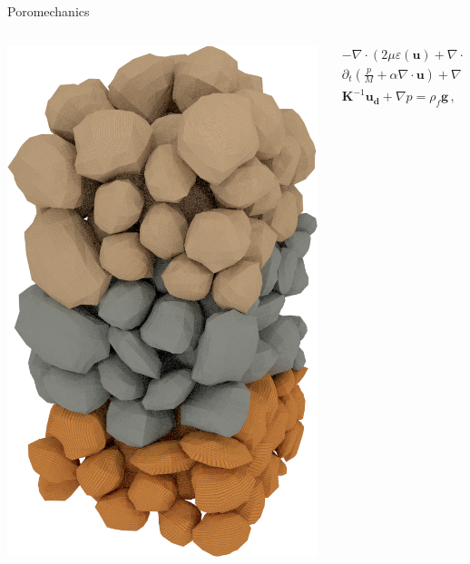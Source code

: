 \documentclass{beamer}
\begin{document}
\begin{frame}{Poromechanics}
\begin{columns}
\begin{column}{0.4\textwidth}
\includegraphics[width=0.9\columnwidth]{figure/poromech}
\end{column}
\begin{column}{0.4\textwidth}
	\begin{align*}
 	-\nabla \cdot \left(  2\mu\varepsilon (\mathbf{u}) + \nabla\cdot \mathbf{u}\right) + \alpha \nabla p=\rho\mathbf{g} \, ,\\
 	\partial_t \left(\frac{p}{M} + \alpha \nabla \cdot \mathbf{u}\right)+ \nabla\cdot \mathbf{u_d}=S_f\,,\\ 
 	\mathbf{K}^{-1}\mathbf{u_d} + \nabla p = \rho_f\mathbf{g}\,,
 \end{align*}
\end{column}
\end{columns}
\end{frame}
\end{document}
